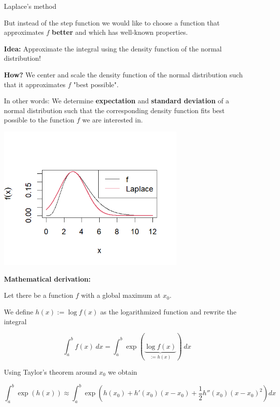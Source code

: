 \documentclass[11pt,compress,t,notes=noshow, xcolor=table]{beamer}
\begin{document}
\begin{vbframe}{Laplace's method}
\framebreak

But instead of the step function we would like to choose a function that approximates $f$ \textbf{better} and which has well-known properties.

\lz

\textbf{Idea:} Approximate the integral using the density function of the normal distribution!

\lz

\textbf{How?} We center and scale the density function of the normal distribution such that it approximates $f$ "best possible".

\framebreak

In other words: We determine \textbf{expectation} and \textbf{standard deviation} of a normal distribution such that the corresponding density function fits best possible to the function $f$ we are interested in.

\begin{center}
\includegraphics[width =0.7\textwidth]{figure_man/laplace01.png}
\end{center}


\framebreak

\textbf{Mathematical derivation:}

Let there be a function $f$ with a global maximum at $x_0$.

\lz

We define $h(x) := \log f(x)$ as the logarithmized function and rewrite the integral

$$
\int_a^b f(x)~dx = \int_a^b \exp(\underbrace{\log f(x)}_{:=h(x)})~dx
$$

Using Taylor's theorem around $x_0$ we obtain

\small
$$
\int_a^b \exp\left(h(x)\right) \approx \int_a^b \exp\left( h(x_0) + h'(x_0)(x - x_0) + \frac{1}{2} h''(x_0)(x - x_0)^2\right) dx
$$
\normalsize


\end{vbframe}
\end{document}
